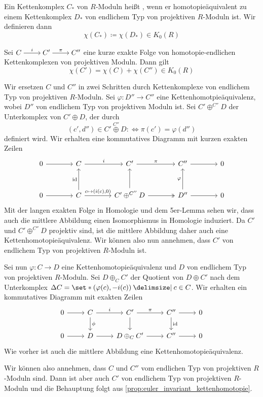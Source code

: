 \begin{definition}[{name=[homologie-endlich]}]
    Ein Kettenkomplex $C_*$ von $R$-Moduln heißt , wenn er homotopieäquivalent zu einem Kettenkomplex $D_*$ von endlichem Typ von projektiven $R$-Moduln ist.
    Wir definieren dann 
    \[
        \chi(C_*) \coloneqq \chi(D_*) \in K_0(R)
    \]
\end{definition}

\begin{lemma}
    Sei 
    \(
    	\begin{tikzcd}[cramped]
            C \rar["i"] & C' \rar["\pi"] & C''
        \end{tikzcd}
    \) 
	eine kurze exakte Folge von homotopie-endlichen Kettenkomplexen von projektiven Moduln.
	Dann gilt
	\[
		\chi(C') = \chi(C) + \chi(C'') \in K_0(R)
	\]
\end{lemma}
\begin{beweis}
	Wir ersetzen $C$ und $C''$ in zwei Schritten durch Kettenkomplexe von endlichem Typ von projektiven $R$-Moduln.
	Sei $\varphi \colon D'' \to C''$ eine Kettenhomotpieäquivalenz, wobei $D''$ von endlichem Typ von projektiven Moduln ist.
	Sei $C' \oplus^{C''} D$ der Unterkomplex von $C' \oplus D$, der durch 
	\[
		(c',d'') \in C' \stackrel{C''}{\oplus} D :\Leftrightarrow \pi(c') =\varphi(d'')
	\]
	definiert wird.
	Wir erhalten eine kommutatives Diagramm mit kurzen exakten Zeilen
	\[
		\begin{tikzcd}[column sep=3.8em,row sep=2.8em]
			0 \rar & C \rar["i"] & C' \rar["\pi"] & C'' \rar & 0 \\
			0 \rar & C \rar["{c \mapsto (i(c),0)}"] \uar["\id"] & C' \oplus^{C''} D \rar[two heads] \uar & D'' \rar \uar["\varphi"] & 0
		\end{tikzcd}
	\]
	Mit der langen exakten Folge in Homologie und dem 5er-Lemma sehen wir, dass auch die mittlere Abbildung einen Isomorphismus in Homologie induziert.
	Da $C'$ und $C' \oplus^{C''} D$ projektiv sind, ist die mittlere Abbildung daher auch eine Kettenhomotopieäquivalenz.
	Wir können also nun annehmen, dass $C'$ von endlichem Typ von projektiven $R$-Moduln ist.
	
	Sei nun  $\varphi \colon C \to D$ eine Kettenhomotopieäquivalenz und $D$ von endlichem Typ von projektiven $R$-Moduln.
	Sei $D \oplus_C C'$ der Quotient von $D \oplus C'$ nach dem Unterkomplex $\Delta C = \set*{\enbrace*{\varphi(c), - i(c)} \given c \in C}$.
	Wir erhalten ein kommutatives Diagramm mit exakten Zeilen
	\[
		\begin{tikzcd}
			0 \rar &C \dar["\phi"] \rar["i"] & C' \rar["\pi"] \dar & C'' \rar \dar["\id"] & 0 \\
			0 \rar & D \rar & D \oplus_C C' \rar & C'' \rar & 0
		\end{tikzcd}
	\]
	Wie vorher ist auch die mittlere Abbildung eine Kettenhomotopieäquivalenz.
	
	Wir können also annehmen, dass $C$ und $C''$ vom endlichen Typ von projektiven $R$-Moduln sind.
	Dann ist aber auch $C'$ von endlichem Typ von projektiven $R$-Moduln und die Behauptung folgt aus \autoref{prop:euler_invariant_kettenhomotopie}.
\end{beweis}


